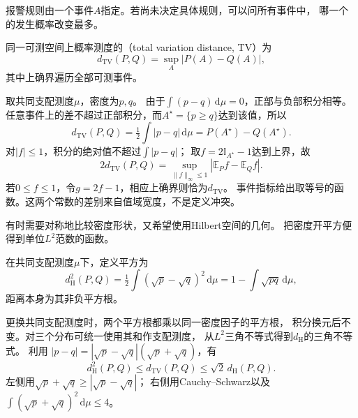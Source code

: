 报警规则由一个事件\(A\)指定。若尚未决定具体规则，可以问所有事件中，
哪一个的发生概率改变最多。

\begin{definition}[总变差距离]
\label{def:information-total-variation}
同一可测空间上概率测度的（total variation distance, TV）为
\begin{equation}
  d_{\mathrm{TV}}(P,Q)=\sup_A|P(A)-Q(A)|,
  \label{eq:information-total-variation}
\end{equation}
其中上确界遍历全部可测事件。
\end{definition}

取共同支配测度\(\mu\)，密度为\(p,q\)。
由于\(\int(p-q)\,\mathrm d\mu=0\)，正部与负部积分相等。
任意事件上的差不超过正部积分，而\(A^\star=\{p\geq q\}\)达到该值，所以
\begin{equation}
  d_{\mathrm{TV}}(P,Q)=\tfrac12\int|p-q|\,\mathrm d\mu
   =P(A^\star)-Q(A^\star).
  \label{eq:information-tv-density}
\end{equation}
对\(|f|\leq1\)，积分的绝对值不超过\(\int|p-q|\)；
取\(f=2\mathbb I_{A^\star}-1\)达到上界，故
\begin{equation}
  2d_{\mathrm{TV}}(P,Q)
   =\sup_{\|f\|_\infty\leq1}|\mathbb E_Pf-\mathbb E_Qf|.
  \label{eq:information-tv-dual}
\end{equation}
若\(0\leq f\leq1\)，令\(g=2f-1\)，相应上确界则恰为\(d_{\mathrm{TV}}\)。
事件指标给出取等号的函数。这两个常数的差别来自值域宽度，不是定义冲突。

有时需要对称地比较密度形状，又希望使用Hilbert空间的几何。
把密度开平方便得到单位\(L^2\)范数的函数。

\begin{definition}[Hellinger距离]
\label{def:information-hellinger-distance}
在共同支配测度\(\mu\)下，定义平方为
\begin{equation}
  d_{\mathrm H}^2(P,Q)=\tfrac12\int(\sqrt p-\sqrt q)^2\,\mathrm d\mu
   =1-\int\sqrt{pq}\,\mathrm d\mu,
  \label{eq:information-hellinger}
\end{equation}
距离本身为其非负平方根。
\end{definition}
更换共同支配测度时，两个平方根都乘以同一密度因子的平方根，
积分换元后不变。对三个分布可统一使用其和作支配测度，
从\(L^2\)三角不等式得到\(d_{\mathrm H}\)的三角不等式。
利用
\(|p-q|=|\sqrt p-\sqrt q|(\sqrt p+\sqrt q)\)，有
\[
  d_{\mathrm H}^2(P,Q)\leq d_{\mathrm{TV}}(P,Q)
  \leq\sqrt2\,d_{\mathrm H}(P,Q).
\]
左侧用\(\sqrt p+\sqrt q\geq|\sqrt p-\sqrt q|\)；
右侧用Cauchy--Schwarz以及
\(\int(\sqrt p+\sqrt q)^2\,\mathrm d\mu\leq4\)。


